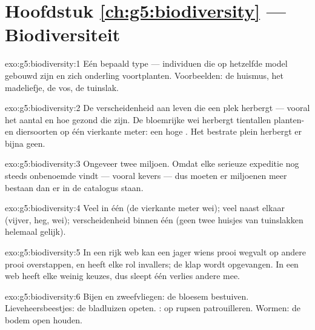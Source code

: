 \section*{Hoofdstuk \ref{ch:g5:biodiversity} --- Biodiversiteit}

\begin{solution}{exo:g5:biodiversity:1}
Eén bepaald type  --- individuen die op hetzelfde model
gebouwd zijn en zich onderling voortplanten. Voorbeelden: de huismus,
het madeliefje, de vos, de tuinslak.
\end{solution}

\begin{solution}{exo:g5:biodiversity:2}
De verscheidenheid aan leven die een plek herbergt --- vooral het aantal
 en hoe gezond die zijn. De bloemrijke wei herbergt tientallen
planten- en diersoorten op één vierkante meter: een hoge .
Het bestrate plein herbergt er bijna geen.
\end{solution}

\begin{solution}{exo:g5:biodiversity:3}
Ongeveer twee miljoen. Omdat elke serieuze expeditie nog steeds
onbenoemde  vindt --- vooral kevers --- dus moeten er miljoenen
meer bestaan dan er in de catalogus staan.
\end{solution}

\begin{solution}{exo:g5:biodiversity:4}
Veel  in één  (de vierkante meter wei); veel
 naast elkaar (vijver, heg, wei); verscheidenheid binnen één
 (geen twee huisjes van tuinslakken helemaal gelijk).
\end{solution}

\begin{solution}{exo:g5:biodiversity:5}
In een rijk web kan een jager wiens prooi wegvalt op andere prooi
overstappen, en heeft elke rol invallers; de klap wordt opgevangen. In
een  web heeft elke  weinig keuzes, dus sleept één verlies
andere mee.
\end{solution}

\begin{solution}{exo:g5:biodiversity:6}
Bijen en zweefvliegen: de bloesem bestuiven. Lieveheersbeestjes: de
bladluizen opeten. : op rupsen patrouilleren. Wormen: de bodem
open houden.
\end{solution}

